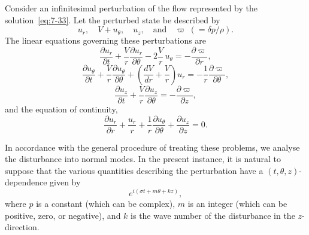 Consider an infinitesimal perturbation of the flow represented by the
solution~\eqref{eq:7-33}.  Let the perturbed state be described by
\begin{equation}
\label{eq:7-34}
u_r, \quad V\!+\!u_\theta, \quad u_z, \quad \text{and} \quad
\varpi\;(= \delta p/\rho).
\end{equation}
The linear equations governing these perturbations are
\begin{equation}
\label{eq:7-35}
\frac{\partial u_r}{\partial t}
+ \frac{V}{r}\frac{\partial u_r}{\partial \theta}
- 2\frac{V}{r}\,u_\theta
= -\frac{\partial \varpi}{\partial r},
\end{equation}
\begin{equation}
\label{eq:7-36}
\frac{\partial u_\theta}{\partial t}
+ \frac{V}{r}\frac{\partial u_\theta}{\partial \theta}
+ \left(\frac{dV}{dr}+\frac{V}{r}\right) u_r
= -\frac{1}{r}\frac{\partial \varpi}{\partial \theta},
\end{equation}
\begin{equation}
\label{eq:7-37}
\frac{\partial u_z}{\partial t}
+ \frac{V}{r}\frac{\partial u_z}{\partial \theta}
= -\frac{\partial \varpi}{\partial z},
\end{equation}
and the equation of continuity,
\begin{equation}
\label{eq:7-38}
\frac{\partial u_r}{\partial r}
+ \frac{u_r}{r}
+ \frac{1}{r}\frac{\partial u_\theta}{\partial \theta}
+ \frac{\partial u_z}{\partial z} = 0.
\end{equation}

In accordance with the general procedure of treating these problems,
we analyse the disturbance into normal modes.  In the present instance,
it is natural to suppose that the various quantities describing the
perturbation have a $(t,\theta,z)$-dependence given by
\begin{equation}
\label{eq:7-39}
e^{i(\sigma t + m\theta + kz)},
\end{equation}
where $p$ is a constant (which can be complex), $m$ is an integer (which
can be positive, zero, or negative), and $k$ is the wave number of the
disturbance in the $z$-direction.

